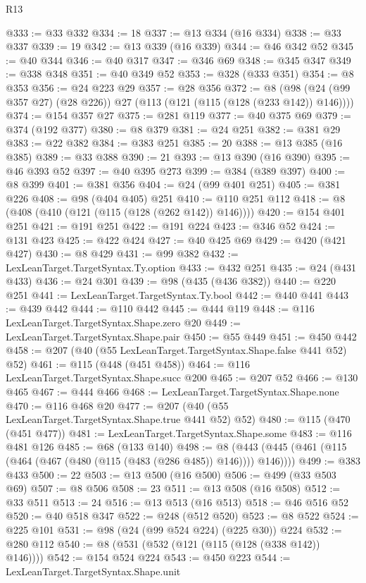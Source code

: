 \begin{lexlean}{R13}
\begin{coremodule}
@333 := @33 @332
@334 := 18
@337 := @13 @334 (@16 @334)
@338 := @33 @337
@339 := 19
@342 := @13 @339 (@16 @339)
@344 := @46 @342 @52
@345 := @40 @344
@346 := @40 @317
@347 := @346 @69
@348 := @345 @347
@349 := @338 @348
@351 := @40 @349 @52
@353 := @328 (@333 @351)
@354 := @8 @353
@356 := @24 @223 @29
@357 := @28 @356
@372 := @8 (@98 (@24 (@99 @357 @27) (@28 @226)) @27 (@113 (@121 (@115 (@128 (@233 @142)) @146))))
@374 := @154 @357 @27
@375 := @281 @119
@377 := @40 @375 @69
@379 := @374 (@192 @377)
@380 := @8 @379
@381 := @24 @251
@382 := @381 @29
@383 := @22 @382
@384 := @383 @251
@385 := 20
@388 := @13 @385 (@16 @385)
@389 := @33 @388
@390 := 21
@393 := @13 @390 (@16 @390)
@395 := @46 @393 @52
@397 := @40 @395 @273
@399 := @384 (@389 @397)
@400 := @8 @399
@401 := @381 @356
@404 := @24 (@99 @401 @251)
@405 := @381 @226
@408 := @98 (@404 @405) @251
@410 := @110 @251 @112
@418 := @8 (@408 (@410 (@121 (@115 (@128 (@262 @142)) @146))))
@420 := @154 @401 @251
@421 := @191 @251
@422 := @191 @224
@423 := @346 @52
@424 := @131 @423
@425 := @422 @424
@427 := @40 @425 @69
@429 := @420 (@421 @427)
@430 := @8 @429
@431 := @99 @382
@432 := LexLeanTarget.TargetSyntax.Ty.option
@433 := @432 @251
@435 := @24 (@431 @433)
@436 := @24 @301
@439 := @98 (@435 (@436 @382))
@440 := @220 @251
@441 := LexLeanTarget.TargetSyntax.Ty.bool
@442 := @440 @441
@443 := @439 @442
@444 := @110 @442
@445 := @444 @119
@448 := @116 LexLeanTarget.TargetSyntax.Shape.zero @20
@449 := LexLeanTarget.TargetSyntax.Shape.pair
@450 := @55 @449
@451 := @450 @442
@458 := @207 (@40 (@55 LexLeanTarget.TargetSyntax.Shape.false @441 @52) @52)
@461 := @115 (@448 (@451 @458))
@464 := @116 LexLeanTarget.TargetSyntax.Shape.succ @200
@465 := @207 @52
@466 := @130 @465
@467 := @444 @466
@468 := LexLeanTarget.TargetSyntax.Shape.none
@470 := @116 @468 @20
@477 := @207 (@40 (@55 LexLeanTarget.TargetSyntax.Shape.true @441 @52) @52)
@480 := @115 (@470 (@451 @477))
@481 := LexLeanTarget.TargetSyntax.Shape.some
@483 := @116 @481 @126
@485 := @68 (@133 @140)
@498 := @8 (@443 (@445 (@461 (@115 (@464 (@467 (@480 (@115 (@483 (@286 @485)) @146)))) @146))))
@499 := @383 @433
@500 := 22
@503 := @13 @500 (@16 @500)
@506 := @499 (@33 @503 @69)
@507 := @8 @506
@508 := 23
@511 := @13 @508 (@16 @508)
@512 := @33 @511
@513 := 24
@516 := @13 @513 (@16 @513)
@518 := @46 @516 @52
@520 := @40 @518 @347
@522 := @248 (@512 @520)
@523 := @8 @522
@524 := @225 @101
@531 := @98 (@24 (@99 @524 @224) (@225 @30)) @224
@532 := @280 @112
@540 := @8 (@531 (@532 (@121 (@115 (@128 (@338 @142)) @146))))
@542 := @154 @524 @224
@543 := @450 @223
@544 := LexLeanTarget.TargetSyntax.Shape.unit

\end{coremodule}
\end{lexlean}
